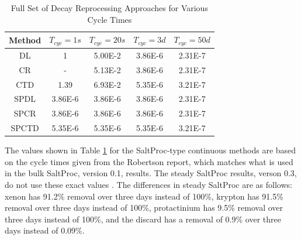 \begin{table}[H]
\renewcommand{\arraystretch}{1.25}
\caption{Full Set of Decay Reprocessing Approaches for Various Cycle Times}
\label{tab:repr_decay_view_full}
\begin{center}
\begin{tabular}{ c | c | c | c | c }
 \hline
 Method & $T_{cyc} = 1 s$ & $T_{cyc} = 20 s$ & $T_{cyc} = 3 d$ & $T_{cyc} = 50 d$\\
 \hline
 \hline
 DL & 1 & 5.00E-2 & 3.86E-6 & 2.31E-7\\
 CR & - & 5.13E-2 & 3.86E-6 & 2.31E-7\\
 CTD & 1.39 & 6.93E-2 & 5.35E-6 & 3.21E-7\\
 \hline
 SPDL & 3.86E-6 & 3.86E-6 & 3.86E-6 & 2.31E-7\\
 SPCR & 3.86E-6 & 3.86E-6 & 3.86E-6 & 2.31E-7\\
 SPCTD & 5.35E-6 & 5.35E-6 & 5.35E-6 & 3.21E-7\\
 \hline
\end{tabular}
\end{center}
\end{table}

The values shown in Table \ref{tab:repr_decay_view_full} for the SaltProc-type continuous methods are based on the cycle times given from the Robertson report, which matches what is used in the bulk SaltProc, version 0.1, results. The steady SaltProc results, verson 0.3, do not use these exact values \cite{robertson_conceptual_1971, rykhlevskii_advanced_2018}. The differences in steady SaltProc are as follows: xenon has 91.2\% removal over three days instead of 100\%, krypton has 91.5\% removal over three days instead of 100\%, protactinium has 9.5\% removal over three days instead of 100\%, and the discard has a removal of 0.9\% over three days instead of 0.09\%. %




